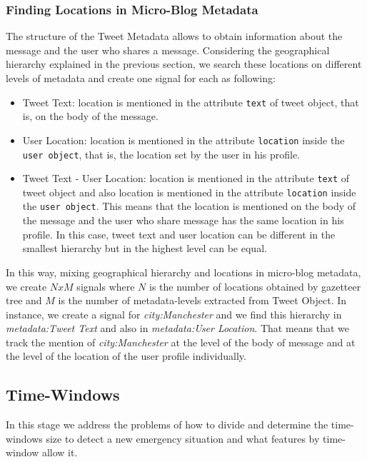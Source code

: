 \documentclass[sigconf]{acmart}
\begin{document}
\subsubsection{Finding Locations in Micro-Blog Metadata}

The structure of the Tweet Metadata allows to obtain information about the message and the user who shares a message. Considering the geographical hierarchy explained in the previous section, we search these locations on different levels of metadata and create one signal for each as following:

\begin{itemize}
	\item Tweet Text: location is mentioned in the attribute \texttt{text} of tweet object, that is, on the body of the message.
	\item User Location: location is mentioned in the attribute \texttt{location} inside the \texttt{user object}, that is, the location set by the user in his profile.
	\item Tweet Text - User Location: location is mentioned in the attribute \texttt{text} of tweet object and also location is mentioned in the attribute \texttt{location} inside the \texttt{user object}. This means that the location is mentioned on the body of the message and the user who share message has the same location in his profile. In this case, tweet text and user location can be different in the smallest hierarchy but in the highest level can be equal. 
\end{itemize}

In this way, mixing geographical hierarchy and locations in micro-blog metadata, we create $NxM$ signals where $N$ is the number of locations obtained by gazetteer tree and $M$ is the number of metadata-levels extracted from Tweet Object. In instance, we create a signal for \textit{city:Manchester} and we find this hierarchy in \textit{metadata:Tweet Text} and also in \textit{metadata:User Location}. That means that we track the mention of \textit{city:Manchester} at the level of the body of message and at the level of the location of the user profile individually.

\subsection{Time-Windows}
In this stage we address the problems of how to divide and determine the time-windows size to detect a new emergency situation and what features by time-window allow it.
\end{document}

